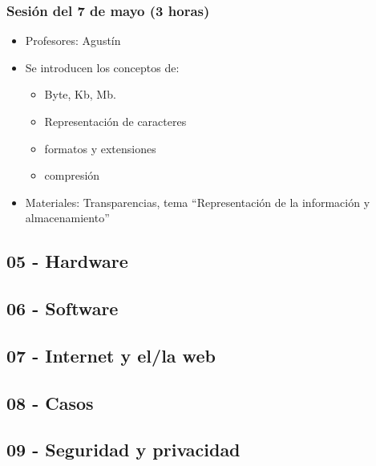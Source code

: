 \documentclass[a4paper,12pt]{article}
\begin{document}
\subsubsection{Sesión del 7 de mayo (3 horas)}
\begin{itemize}
\item Profesores: Agustín
\item Se introducen los conceptos de:
\begin{itemize}
\item Byte, Kb, Mb.
\item Representación de caracteres
\item formatos y extensiones
\item compresión
\end{itemize}
\item Materiales: Transparencias, tema ``Representación de la información y almacenamiento''
\end{itemize}
\subsection{05 - Hardware}

\subsection{06 - Software}

\subsection{07 - Internet y el/la web}

\subsection{08 - Casos}

\subsection{09 - Seguridad y privacidad}
\end{document}
